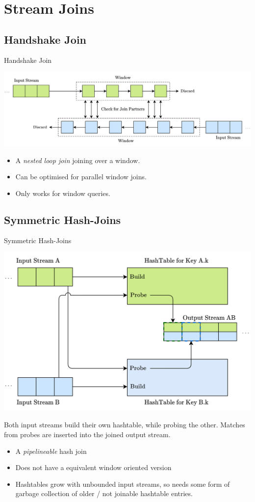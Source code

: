 \section{Stream Joins}
\subsection{Handshake Join}
\begin{definitionbox}{Handshake Join}
    \begin{center}
        \includegraphics[width=\textwidth]{streams/images/handshake_join.drawio.png}
    \end{center}
    \begin{itemize}
        \item A \textit{nested loop join} joining over a window.
        \item Can be optimised for parallel window joins.
        \item Only works for window queries.
    \end{itemize}
\end{definitionbox}

\subsection{Symmetric Hash-Joins}
\begin{definitionbox}{Symmetric Hash-Joins}
    \begin{center}
        \includegraphics[width=.7\textwidth]{streams/images/symmetric_hash_join.drawio.png}
    \end{center}
    Both input streams build their own hashtable, while probing the other. Matches from probes are inserted into the joined output stream.
    \begin{itemize}
        \item A \textit{pipelineable} hash join
        \item Does not have a equivalent window oriented version
        \item Hashtables grow with unbounded input streams, so needs some form of garbage collection of older / not joinable hashtable entries.
    \end{itemize}
\end{definitionbox}

